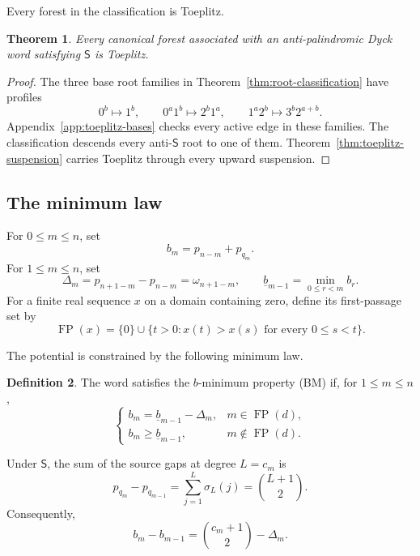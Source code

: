 \documentclass[11pt]{article}
\newtheorem{theorem}{Theorem}[section]
\theoremstyle{definition}
\newtheorem{definition}[theorem]{Definition}
\theoremstyle{remark}
\DeclareMathOperator{\FP}{FP}
\begin{document}
Every forest in the classification is Toeplitz.
\begin{theorem}
Every canonical forest associated with an anti-palindromic Dyck word
satisfying \(\mathsf S\) is Toeplitz.
\end{theorem}

\begin{proof}
The three base root families in Theorem~\ref{thm:root-classification} have
profiles
\begin{equation}
\label{eq:base-toeplitz-profiles}
 0^b\mapsto1^b,
 \qquad
 0^a1^b\mapsto2^b1^a,
 \qquad
 1^a2^b\mapsto3^b2^{a+b}.
\end{equation}
Appendix~\ref{app:toeplitz-bases} checks every active edge in these families.
The classification descends every anti-\(\mathsf S\) root to one of them.
Theorem~\ref{thm:toeplitz-suspension} carries Toeplitz through every upward
suspension.
\end{proof}

\subsection{The minimum law}

For \(0\leq m\leq n\), set
\begin{equation*}
 b_m=p_{n-m}+p_{q_m}.
\end{equation*}
For \(1\leq m\leq n\), set
\[
 \Delta_m=p_{n+1-m}-p_{n-m}=\omega_{n+1-m},
 \qquad
 \underline b_{m-1}=\min_{0\leq r<m}b_r.
\]
For a finite real sequence \(x\) on a domain containing zero, define its
first-passage set by
\[
 \FP(x)=\{0\}\cup
 \{t>0:x(t)>x(s)\text{ for every }0\leq s<t\}.
\]

The potential is constrained by the following minimum law.
\begin{definition}
The word satisfies the \(b\)-minimum property (BM) if, for
\(1\leq m\leq n\),
\begin{equation}
\label{eq:BM}
 \begin{cases}
 b_m=\underline b_{m-1}-\Delta_m,&m\in\FP(d),\\
 b_m\geq\underline b_{m-1},&m\notin\FP(d).
 \end{cases}
\end{equation}
\end{definition}

Under \(\mathsf S\), the sum of the source gaps at degree \(L=c_m\) is
\[
 p_{q_m}-p_{q_{m-1}}
 =\sum_{j=1}^L\sigma_L(j)
 =\binom{L+1}{2}.
\]
Consequently,
\begin{equation}
\label{eq:b-increment}
 b_m-b_{m-1}=\binom{c_m+1}{2}-\Delta_m.
\end{equation}
\end{document}
